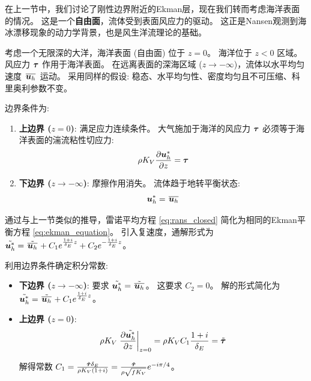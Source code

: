 在上一节中，我们讨论了刚性边界附近的Ekman层，现在我们转而考虑海洋表面的情况。
这是一个\textbf{自由面}，流体受到表面风应力的驱动。
这正是Nansen观测到海冰漂移现象的动力学背景，也是风生洋流理论的基础。

考虑一个无限深的大洋，海洋表面 (自由面) 位于 $z = 0$。
海洋位于 $z < 0$ 区域。
风应力 ${\bm{\tau}}$ 作用于海洋表面。
在远离表面的深海区域 ($z \to -\infty$)，流体以水平均匀速度 $\mkern2mu \overline{\bm{u}_h} \mkern2mu$ 运动。
采用同样的假设: 稳态、水平均匀性、密度均匀且不可压缩、科里奥利参数不变。

边界条件为:
\begin{enumerate}
    \item \textbf{上边界 ($z = 0$)}: 满足应力连续条件。
    大气施加于海洋的风应力 ${\bm{\tau}}$ 必须等于海洋表面的湍流粘性切应力:
    \begin{equation}
        \density \eddyviscv \pde{\flayer{\vel}_h}{z} = \wind
        \label{eq:ekman_fs_boundary_condition_top}
    \end{equation}

    \item \textbf{下边界 ($z \to -\infty$)}: 摩擦作用消失。
    流体趋于地转平衡状态:
    \begin{equation}
        \bm{u}^*_h = \mkern2mu \overline{\bm{u}_h} \mkern2mu
        \label{eq:ekman_fs_boundary_condition_bottom}
    \end{equation}
\end{enumerate}

通过与上一节类似的推导，雷诺平均方程 \eqref{eq:rans_closed} 简化为相同的Ekman平衡方程 \eqref{eq:ekman_equation}。
引入复速度，通解形式为 $\tilde{\bm{u}_h^*} = \tilde{\mkern2mu \overline{\bm{u}_h} \mkern2mu} + C_1 e^{\frac{1+i}{\delta_E} z} + C_2 e^{-\frac{1+i}{\delta_E} z}$。

利用边界条件确定积分常数:
\begin{itemize}
    \item \textbf{下边界 ($z \to -\infty$)}: 要求 $\tilde{\bm{u}_h^*} = \tilde{\mkern2mu \overline{\bm{u}_h} \mkern2mu}$。
    这要求 $C_2 = 0$。
    解的形式简化为 $\tilde{\bm{u}_h^*} = \tilde{\mkern2mu \overline{\bm{u}_h} \mkern2mu} + C_1 e^{\frac{1+i}{\delta_E} z}$。

    \item \textbf{上边界 ($z = 0$)}:
    \begin{equation*}
        \density \eddyviscv \left.\pde{\complex{\flayer{\vel_h}}}{z}\right|_{z=0} = \density \eddyviscv C_1 \frac{1+i}{\ekmandepth} = \complex{\wind}
    \end{equation*}

    解得常数 $C_1 = \frac{\tilde{{\bm{\tau}}} \delta_E}{\rho K_V (1+i)} = \frac{\tilde{{\bm{\tau}}}}{\rho \sqrt{f K_V}} e^{-i \pi/4}$。
\end{itemize}

